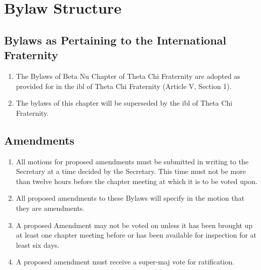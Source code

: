 \chapter{Bylaw Structure}

\section{Bylaws as Pertaining to the International Fraternity}

	\begin{enumerate}
		\item The Bylaws of Beta Nu Chapter of Theta Chi Fraternity are adopted as provided for in the \gls{ibl} of Theta Chi Fraternity (Article V, Section 1).

		\item The bylaws of this chapter will be superseded by the \gls{ibl} of Theta Chi Fraternity.
	\end{enumerate}

\section{Amendments}
\label{bylaw-amendments}
	\begin{enumerate}
		\item All motions for proposed amendments must be submitted in writing to the Secretary at a time decided by the Secretary. This time must not be more than twelve hours before the chapter meeting at which it is to be voted upon. \label{bylaw-time}

		\item All proposed amendments to these Bylaws will specify in the motion that they are amendments.

		\item A proposed Amendment may not be voted on unless it has been brought up at least one chapter meeting before or has been available for inspection for at least six days.

		\item A proposed amendment must receive a \gls{super-maj} vote for ratification.

	\end{enumerate}

